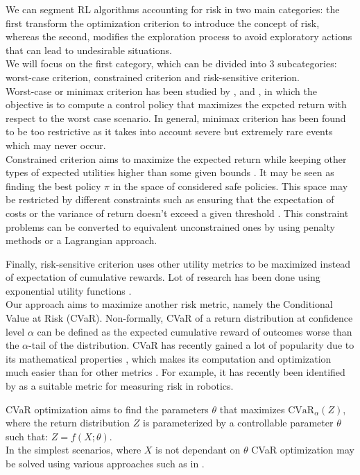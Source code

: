 We can segment RL algorithms accounting for risk in two main categories: the first transform 
the optimization criterion to introduce the concept of risk, whereas the second, modifies
the exploration process to avoid exploratory actions that can lead to undesirable situations.\\
We will focus on the first category, which can be divided into 3 subcategories: worst-case
criterion, constrained criterion and risk-sensitive criterion.\\
Worst-case or minimax criterion has been studied by \citet{Heger1994}, 
\citet{Coraluppi1997} and \citet{Coraluppi1999},
in which the objective is to compute a control policy that maximizes the expcted return
with respect to the worst case scenario. In general, minimax criterion has
been found to be too restrictive as it takes into
account severe but extremely rare events which may never occur.\\
Constrained criterion  aims to maximize the expected return while keeping
other types of expected utilities higher than some given bounds \citep{Altman1993}.
It may be seen as finding the best policy $\pi$ in the space of considered safe policies.
This space may be restricted by different constraints such as ensuring that
the expectation of costs \citep{Geibel2006} or the variance of return doesn't exceed
a given threshold \citep{Tamar2012}.
This constraint problems can be converted to equivalent unconstrained ones by using
penalty methods or a Lagrangian approach.

Finally, risk-sensitive criterion uses other utility metrics to be maximized instead of
expectation of cumulative rewards.
Lot of research has been done using exponential utility functions
\citep{Howard1972,Chung1987}.\\
Our approach aims to maximize
another risk metric, namely the Conditional Value at Risk (CVaR).
Non-formally, CVaR of a return distribution at confidence level $\alpha$ can be defined as the expected
cumulative reward of outcomes worse than the $\alpha$-tail of the distribution.
CVaR has recently gained a lot of popularity due to its mathematical properties \citep{Artzner1999},
which makes its computation and optimization much easier than for other metrics  \citep{Rockafellar2000}.
For example, 
it has recently been identified by \citet{Majumdar2020} as a suitable metric
for measuring risk in robotics.

CVaR optimization aims to find the parameters $\theta$ that maximizes 
$\text{CVaR}_\alpha (Z)$, where the return distribution $Z$ is parameterized by a 
controllable parameter $\theta$ such that: $Z = f(X; \theta)$.\\
In the simplest scenarios, where $X$ is not dependant on $\theta$ CVaR optimization may 
be solved using various approaches such as in \citet{Rockafellar2000}.\\

